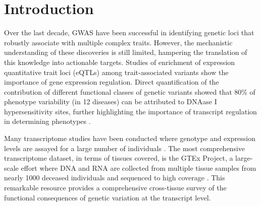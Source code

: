 \documentclass[10pt]{article}
\begin{document}



%
\section*{Introduction}
%
Over the last decade, GWAS have been successful in identifying genetic loci that robustly associate with multiple complex traits. However, the mechanistic understanding of these discoveries is still limited, hampering the translation of this knowledge into actionable targets. Studies of enrichment of expression quantitative trait loci (eQTLs) among trait-associated variants \cite{Nica2010,Nicolae2010} show the importance of gene expression regulation. Direct quantification of the contribution of different functional classes of genetic variants showed that 80\% of phenotype variability (in 12 diseases) can be attributed to DNAase I hypersensitivity sites, further highlighting the importance of transcript regulation in determining phenotypes \cite{Gusev2014}.

Many transcriptome studies have been conducted where genotype and expression levels are assayed for a large number of individuals \cite{Battle2014, Lappalainen2013, Zhang2015,Stranger2012}. The most comprehensive transcriptome dataset, in terms of tissues covered, is the GTEx Project, a large-scale effort where DNA and RNA are collected from multiple tissue samples from nearly 1000 deceased individuals  and sequenced to high coverage \cite{TheGTExConsortium2013}. This remarkable resource provides a comprehensive cross-tissue survey of the functional consequences of genetic variation at the transcript level.
%
%
%
% 
 
\end{document}
